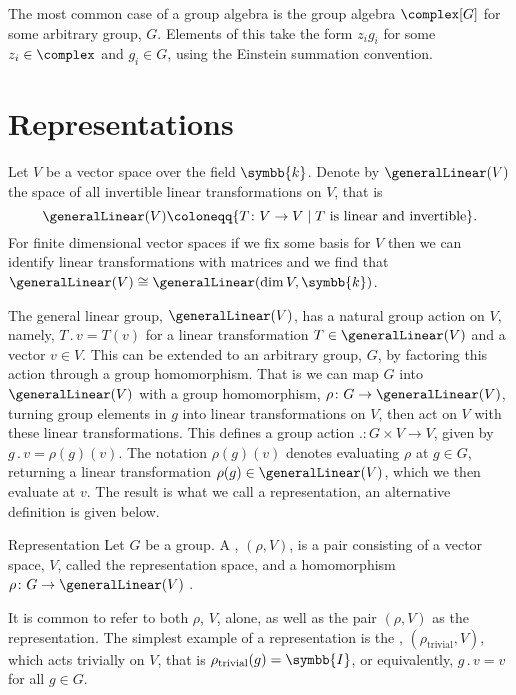 \documentclass[fleqn]{NotesClass}
\newcommand{\identityMatrix}{\symbb{I}}
\renewcommand{\field}{\symbb{k}}
\newcommand{\action}{\mathbin{.}}
\newcommand{\isomorphic}{\cong}
\begin{document}
    The most common case of a group algebra is the group algebra \(\complex[G]\) for some arbitrary group, \(G\).
    Elements of this take the form \(z_i g_i\) for some \(z_i \in \complex\) and \(g_i \in G\), using the Einstein summation convention.
    
    \section{Representations}
    Let \(V\) be a vector space over the field \(\field\).
    Denote by \(\generalLinear(V)\) the space of all invertible linear transformations on \(V\), that is
    \begin{equation}
        \generalLinear(V) \coloneqq \{T \colon V \to V \mid T \text{ is linear and invertible}\}.
    \end{equation}
    For finite dimensional vector spaces if we fix some basis for \(V\) then we can identify linear transformations with matrices and we find that \(\generalLinear(V) \isomorphic \generalLinear(\dim V, \field)\).
    
    The general linear group, \(\generalLinear(V)\), has a natural group action on \(V\), namely, \(T \action v = T(v)\) for a linear transformation \(T \in \generalLinear(V)\) and a vector \(v \in V\).
    This can be extended to an arbitrary group, \(G\), by factoring this action through a group homomorphism.
    That is we can map \(G\) into \(\generalLinear(V)\) with a group homomorphism, \(\rho \colon G \to \generalLinear(V)\), turning group elements in \(g\) into linear transformations on \(V\), then act on \(V\) with these linear transformations.
    This defines a group action \(\action \colon G \times V \to V\), given by \(g \action v = \rho(g)(v)\).
    The notation \(\rho(g)(v)\) denotes evaluating \(\rho\) at \(g \in G\), returning a linear transformation \(\rho(g) \in \generalLinear(V)\), which we then evaluate at \(v\).
    The result is what we call a representation, an alternative definition is given below.
    
    \begin{dfn}{Representation}{}
        Let \(G\) be a group.
        A , \((\rho, V)\), is a pair consisting of a vector space, \(V\), called the representation space, and a homomorphism \(\rho \colon G \to \generalLinear(V)\) \cite[726]{hassani}.
    \end{dfn}
    
    It is common to refer to both \(\rho\), \(V\), alone, as well as the pair \((\rho, V)\) as the representation.
    The simplest example of a representation is the , \((\rho_{\text{trivial}}, V)\), which acts trivially on \(V\), that is \(\rho_{\text{trivial}}(g) = \identityMatrix\), or equivalently, \(g \action v = v\) for all \(g \in G\).
    
\end{document}
